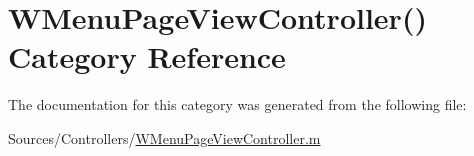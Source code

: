 \hypertarget{category_w_menu_page_view_controller_07_08}{\section{W\-Menu\-Page\-View\-Controller() Category Reference}
\label{category_w_menu_page_view_controller_07_08}
}


The documentation for this category was generated from the following file\-:\begin{DoxyCompactItemize}
\item 
Sources/\-Controllers/\hyperlink{_w_menu_page_view_controller_8m}{W\-Menu\-Page\-View\-Controller.\-m}\end{DoxyCompactItemize}
